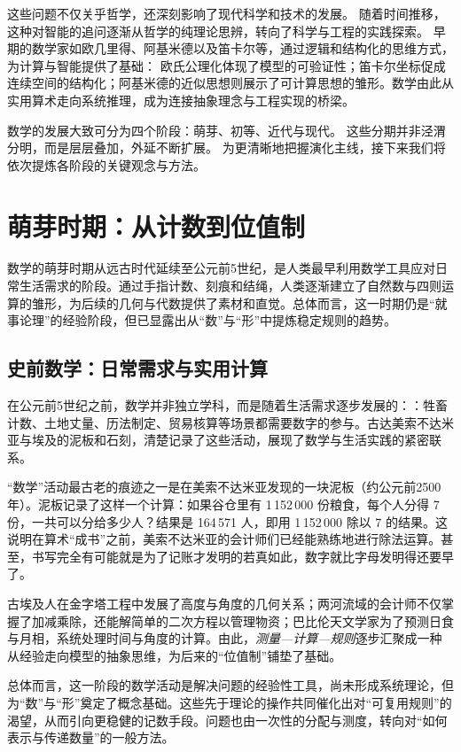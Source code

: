 这些问题不仅关乎哲学，还深刻影响了现代科学和技术的发展。
随着时间推移，这种对智能的追问逐渐从哲学的纯理论思辨，转向了科学与工程的实践探索。
早期的数学家如欧几里得、阿基米德以及笛卡尔等，通过逻辑和结构化的思维方式，为计算与智能提供了基础：
欧氏公理化体现了模型的可验证性；笛卡尔坐标促成连续空间的结构化；阿基米德的近似思想则展示了可计算思想的雏形。数学由此从实用算术走向系统推理，成为连接抽象理念与工程实现的桥梁。

数学的发展大致可分为四个阶段：萌芽、初等、近代与现代。
这些分期并非泾渭分明，而是层层叠加，外延不断扩展。
为更清晰地把握演化主线，接下来我们将依次提炼各阶段的关键观念与方法。

\section{萌芽时期：从计数到位值制}

数学的萌芽时期从远古时代延续至公元前5世纪，是人类最早利用数学工具应对日常生活需求的阶段。通过手指计数、刻痕和结绳，人类逐渐建立了自然数与四则运算的雏形，为后续的几何与代数提供了素材和直觉。总体而言，这一时期仍是“就事论理”的经验阶段，但已显露出从“数”与“形”中提炼稳定规则的趋势。

\subsection{史前数学：日常需求与实用计算}

在公元前5世纪之前，数学并非独立学科，而是随着生活需求逐步发展的：：牲畜计数、土地丈量、历法制定、贸易核算等场景都需要数字的参与。古达美索不达米亚与埃及的泥板和石刻，清楚记录了这些活动，展现了数学与生活实践的紧密联系。

“数学”活动最古老的痕迹之一是在美索不达米亚发现的一块泥板（约公元前2500年）。泥板记录了这样一个计算：如果谷仓里有 1\,152\,000 份粮食，每个人分得 7 份，一共可以分给多少人？结果是 164\,571 人，即用 1\,152\,000 除以 7 的结果。这说明在算术“成书”之前，美索不达米亚的会计师们已经能熟练地进行除法运算。甚至，书写完全有可能就是为了记账才发明的若真如此，数字就比字母发明得还要早了。

古埃及人在金字塔工程中发展了高度与角度的几何关系；两河流域的会计师不仅掌握了加减乘除，还能解简单的二次方程以管理物资；巴比伦天文学家为了预测日食与月相，系统处理时间与角度的计算。由此，\emph{测量—计算—规则}逐步汇聚成一种从经验走向模型的抽象思维，为后来的“位值制”铺垫了基础。

总体而言，这一阶段的数学活动是解决问题的经验性工具，尚未形成系统理论，但为“数”与“形”奠定了概念基础。这些先于理论的操作共同催化出对“可复用规则”的渴望，从而引向更稳健的记数手段。问题也由一次性的分配与测度，转向对“如何表示与传递数量”的一般方法。

